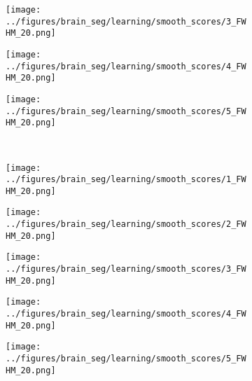 \begin{figure}[h!]
	\begin{subfigure}{0.16\textwidth}
		\centering
		\texttt{[image: ../figures/brain\_seg/learning/smooth\_scores/3\_FWHM\_20.png]}
		\label{fig:8}
	\end{subfigure}
	\begin{subfigure}{0.16\textwidth}
		\centering
		\texttt{[image: ../figures/brain\_seg/learning/smooth\_scores/4\_FWHM\_20.png]}
		\label{fig:9}
	\end{subfigure}
	\begin{subfigure}{0.16\textwidth}
		\centering
		\texttt{[image: ../figures/brain\_seg/learning/smooth\_scores/5\_FWHM\_20.png]}
		\label{fig:10}
	\end{subfigure}
		\\
	\vspace{-0.35cm}
		\begin{subfigure}[b]{0.03\textwidth} %
		\centering
	\end{subfigure}
	\hspace{0.1cm}
	\begin{subfigure}{0.16\textwidth}
		\centering
		\texttt{[image: ../figures/brain\_seg/learning/smooth\_scores/1\_FWHM\_20.png]}
		\label{fig:6}
	\end{subfigure}
	\begin{subfigure}{0.16\textwidth}
		\centering
		\texttt{[image: ../figures/brain\_seg/learning/smooth\_scores/2\_FWHM\_20.png]}
		\label{fig:7}
	\end{subfigure}
	\begin{subfigure}{0.16\textwidth}
		\centering
		\texttt{[image: ../figures/brain\_seg/learning/smooth\_scores/3\_FWHM\_20.png]}
		\label{fig:8}
	\end{subfigure}
	\begin{subfigure}{0.16\textwidth}
		\centering
		\texttt{[image: ../figures/brain\_seg/learning/smooth\_scores/4\_FWHM\_20.png]}
		\label{fig:9}
	\end{subfigure}
	\begin{subfigure}{0.16\textwidth}
		\centering
		\texttt{[image: ../figures/brain\_seg/learning/smooth\_scores/5\_FWHM\_20.png]}
		\label{fig:10}
	\end{subfigure}
	\caption{}
	\label{fig:brain3}
\end{figure}
\newpage
